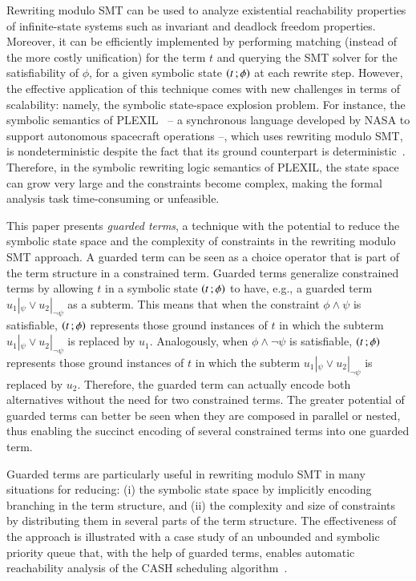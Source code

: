 Rewriting modulo SMT can be used to analyze existential reachability
properties of infinite-state systems such as invariant and deadlock freedom
properties.  Moreover, it can be efficiently implemented by performing
matching (instead of the more costly unification) for the term $t$ and
querying the SMT solver for the satisfiability of $\phi$, for a given
symbolic state $\left( t \,; \phi \right)$ at each rewrite step. 
%
However, the
effective application of this technique comes with new challenges in
terms of scalability: namely, the symbolic state-space explosion
problem. %
For instance, the
symbolic semantics of
PLEXIL~\cite{rocha-thesis-2012,rocha-rewsmtjlamp-2017} -- a
synchronous language developed by NASA to support autonomous
spacecraft operations %
--, which uses rewriting modulo SMT, is nondeterministic despite the fact that its ground
counterpart is deterministic~\cite{dowek-plexilsos-2010}. 
Therefore,
in the symbolic rewriting logic semantics of
PLEXIL, the state space can grow very large and the constraints become
complex, making the formal analysis task time-consuming or unfeasible.

This paper presents \emph{guarded terms}, a technique with the
potential to reduce the symbolic state space and the complexity of
constraints in the rewriting modulo SMT approach. A guarded term can
be seen as a choice operator that is part of the term structure in a
constrained term. Guarded terms generalize constrained terms by
allowing $t$ in a symbolic state $\left( t \,; \phi \right)$ to have, e.g., a
guarded term $u_1|_{\psi} \lor u_2|_{\neg\psi}$ as a subterm.  This
means that when the constraint $\phi\land\psi$ is satisfiable,
$\left( t \,; \phi \right)$ represents those ground instances of $t$ in which the
subterm $u_1|_{\psi} \lor u_2|_{\neg\psi}$ is replaced by $u_1$.
Analogously, when $\phi\land\neg\psi$ is satisfiable, $\left( t \,; \phi \right)$
represents those ground instances of $t$ in which the subterm
$u_1|_{\psi} \lor u_2|_{\neg\psi}$ is replaced by $u_2$.  
Therefore, the guarded term can actually encode both alternatives without the
need for two constrained terms. The greater potential of guarded terms
can better be seen when they are composed in parallel or nested, thus
enabling the succinct encoding of several constrained terms into one
guarded term. 

Guarded terms are particularly useful in rewriting modulo SMT in
many situations for reducing: (i) the symbolic state space by
implicitly encoding branching in the term structure, and (ii) the
complexity and size of constraints by distributing them in several
parts of the term structure. The effectiveness of the approach is
illustrated with a case study of an unbounded and symbolic priority
queue that, with the help of guarded terms, enables automatic
reachability analysis of the %
CASH scheduling
algorithm~\cite{caccamo2000capacity}.

